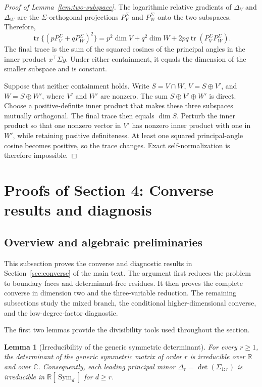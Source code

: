 \documentclass[12pt,a4paper]{article}
\theoremstyle{plain}
\newtheorem{lemma}{Lemma}
\theoremstyle{definition}
\newcommand{\C}{\mathbb{C}}
\newcommand{\R}{\mathbb{R}}
\newcommand{\Sym}{\operatorname{Sym}}
\newcommand{\tr}{\operatorname{tr}}
\begin{document}
\begin{proof}[Proof of Lemma~\ref{lem:two-subspace}]
    The logarithmic relative gradients of $\Delta_V$ and $\Delta_W$ are the $\Sigma$-orthogonal projections $P_V^\Sigma$ and $P_W^\Sigma$ onto the two subspaces.
    Therefore,
    \begin{equation*}
        \tr\{(pP_V^\Sigma+qP_W^\Sigma)^2\}
        =
        p^2\dim V+q^2\dim W+2pq\tr(P_V^\Sigma P_W^\Sigma)
        .
    \end{equation*}
    The final trace is the sum of the squared cosines of the principal angles in the inner product $x^\top\Sigma y$.
    Under either containment, it equals the dimension of the smaller subspace and is constant.

    Suppose that neither containment holds.
    Write $S=V\cap W$, $V=S\oplus V'$, and $W=S\oplus W'$, where $V'$ and $W'$ are nonzero.
    The sum $S\oplus V'\oplus W'$ is direct.
    Choose a positive-definite inner product that makes these three subspaces mutually orthogonal.
    The final trace then equals $\dim S$.
    Perturb the inner product so that one nonzero vector in $V'$ has nonzero inner product with one in $W'$, while retaining positive definiteness.
    At least one squared principal-angle cosine becomes positive, so the trace changes.
    Exact self-normalization is therefore impossible.
\end{proof}

\section{Proofs of Section 4: Converse results and diagnosis}
\label{supp:converse-proofs}

\subsection{Overview and algebraic preliminaries}

This subsection proves the converse and diagnostic results in Section~\ref{sec:converse} of the main text.
The argument first reduces the problem to boundary faces and determinant-free residues.
It then proves the complete converse in dimension two and the three-variable reduction.
The remaining subsections study the mixed branch, the conditional higher-dimensional converse, and the low-degree-factor diagnostic.

The first two lemmas provide the divisibility tools used throughout the section.
\begin{lemma}[Irreducibility of the generic symmetric determinant]
\label{lem:symdet-irreducible}
    For every $r\ge1$, the determinant of the generic symmetric matrix of order $r$ is irreducible over $\R$ and over $\C$.
    Consequently, each leading principal minor $\Delta_r=\det(\Sigma_{1:r})$ is irreducible in $\R[\Sym_d]$ for $d\ge r$.
\end{lemma}
\end{document}
